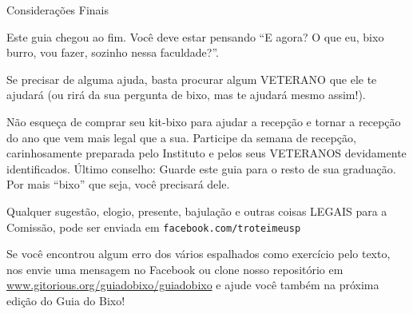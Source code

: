 \begin{secao}{Considerações Finais}

Este guia chegou ao fim. Você deve estar pensando ``E agora? O que eu, bixo
burro, vou fazer, sozinho nessa faculdade?''.

Se precisar de alguma ajuda, basta procurar algum VETERANO que ele te
ajudará (ou rirá da sua pergunta de bixo, mas te ajudará mesmo assim!).

Não esqueça de comprar seu kit-bixo para ajudar a recepção e tornar a recepção
do ano que vem mais legal que a sua. Participe da semana de recepção,
carinhosamente preparada pelo Instituto e pelos seus VETERANOS devidamente
identificados. Último conselho: Guarde este guia para o resto de sua graduação.
Por mais ``bixo'' que seja, você precisará dele.

Qualquer sugestão, elogio, presente, bajulação e outras coisas LEGAIS para a
Comissão, pode ser enviada em {\tt facebook.com/troteimeusp}

Se você encontrou algum erro dos vários espalhados como exercício pelo texto,
nos envie uma mensagem no Facebook ou clone nosso repositório em
\url{www.gitorious.org/guiadobixo/guiadobixo} e ajude você também na próxima 
edição do Guia do Bixo!

\end{secao}

